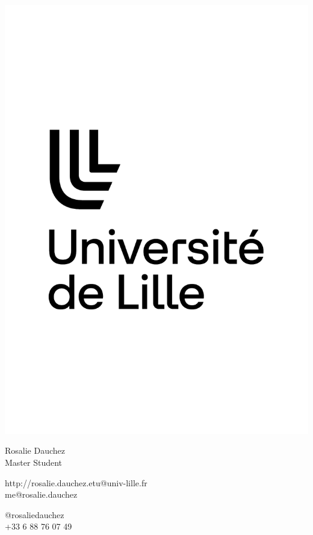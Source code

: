 \documentclass{article}
\begin{document}
\centering \includegraphics[width=.25\linewidth]{logo}\\[5pt]
\parbox{2in}{\Large \centering Rosalie Dauchez\\[1pt]
\normalsize Master Student}

\vfill
\raggedright
\begin{multicols}{2}
http://rosalie.dauchez.etu@univ-lille.fr\\
me@rosalie.dauchez

\columnbreak
\raggedleft
@rosaliedauchez\\
+33 6 88 76 07 49%
\end{multicols}%
\end{document}
